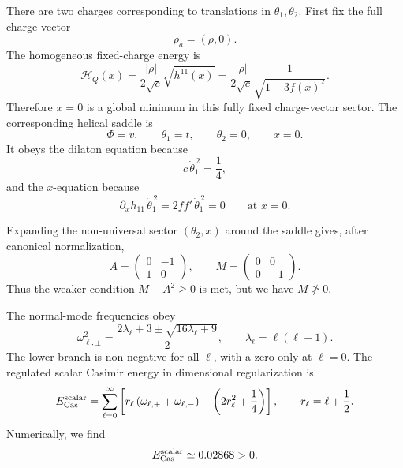 \documentclass[a4paper,11pt]{article}
\begin{document}
There are two charges corresponding to translations in $\theta_1,\theta_2$. First fix the full charge vector
\begin{equation}
  \rho_a=(\rho,0).
\end{equation}
The homogeneous fixed-charge energy is
\begin{equation}\label{eq:counterexample-fixed-vector-energy}
  \mathcal H_Q(x) = \frac{|\rho|}{2\sqrt c} \sqrt{h^{11}(x)} = \frac{|\rho|}{2\sqrt c} \frac{1}{\sqrt{1-3f(x)^2}}.
\end{equation}
Therefore $x=0$ is a global minimum in this fully fixed charge-vector sector. The corresponding helical saddle is
\begin{equation}\label{eq:counterexample-fixed-vector-saddle}
  \Phi=v, \qquad \theta_1=t, \qquad \theta_2=0, \qquad x=0.
\end{equation}
It obeys the dilaton equation because
\begin{equation}
  c\,\dot\theta_1^{\,2} = \frac{1}{4},
\end{equation}
and the $x$-equation because
\begin{equation}
    \partial_x h_{11}\,\dot\theta_1^{\,2}
    =
    2ff'\,\dot\theta_1^{\,2}
    =
    0
    \qquad
    \text{at }x=0.
\end{equation}

Expanding the non-universal sector $(\theta_2,x)$ around the saddle gives, after canonical normalization,
\begin{equation}\label{eq:counterexample-AM}
    A
    =
    \begin{pmatrix}
    0&-1\\
    1&0
    \end{pmatrix},
    \qquad
    M
    =
    \begin{pmatrix}
    0&0\\
    0&-1
    \end{pmatrix}.
\end{equation}
Thus the weaker condition $M-A^2\geq 0$ is met, but we have $M\not\geq0$. 

The normal-mode frequencies obey
\begin{equation}\label{eq:counterexample-boson-frequencies}
  \omega_{\ell,\pm}^2 = \frac{ 2\lambda_\ell+3 \pm \sqrt{16\lambda_\ell+9} }{2}, \qquad \lambda_\ell=\ell(\ell+1).
\end{equation}
The lower branch is non-negative for all $\ell$, with a zero only at $\ell=0$. The regulated scalar Casimir energy in dimensional regularization is
\begin{equation}\label{eq:counterexample-boson-casimir}
E_{\rm Cas}^{\rm scalar}
=
\sum_{\ell=0}^{\infty}
\left[
r_\ell
\left(
\omega_{\ell,+}+\omega_{\ell,-}
\right)
-
\left(
2r_\ell^2+\frac14
\right)
\right],
\qquad
r_\ell=\ell+\frac12 .
\end{equation}
Numerically, we find
\begin{equation}
  E_{\rm Cas}^{\rm scalar} \simeq 0.02868 > 0 .
\end{equation}
\end{document}
